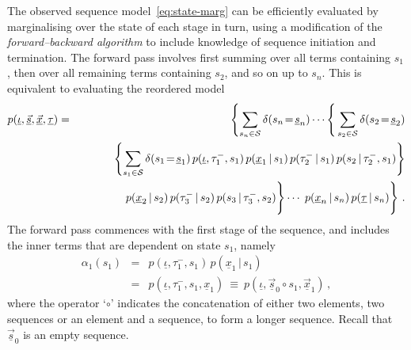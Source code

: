\documentclass[a4paper]{article}
\newcommand{\ui}{\underline{\iota}}
\newcommand{\ut}{\underline{\tau}}
\newcommand{\tm}{\tau^{-}}
\begin{document}
The observed sequence model~\eqref{eq:state-marg} can be efficiently evaluated by marginalising over the state of each stage
in turn, using a modification of the {\em forward--backward algorithm} to include knowledge of
sequence initiation and termination.
 The forward pass involves first summing over all terms containing $s_1$, then over all remaining terms containing $s_2$,
and so on up to $s_n$. This is equivalent to evaluating the reordered model
\begin{eqnarray}
   p(\ui,\underline{\vec{s}},\underline{\vec{x}},\ut) 
& = & 
   \left\{\sum_{s_n\in{\cal S}}\delta(s_n\!=\!\underline{s}_n)
\cdots
\right\{\sum_{s_2\in{\cal S}}\delta(s_2\!=\!\underline{s}_2)
\nonumber\\&&
\hspace*{10mm}{}
\left\{\sum_{s_1\in{\cal S}}\delta(s_1\!=\!\underline{s}_1)\,
p(\ui,\tm_1,s_1)\,p(\underline{x}_1\,|\,s_1)\,p(\tm_2\,|\,s_1)\,p(s_2\,|\,\tm_2,s_1)\right\}
\nonumber\\&&
\left.\rule{0pt}{6mm}
p(\underline{x}_{2}\,|\,s_2)\,p(\tm_3\,|\,s_2)\,p(s_3\,|\,\tm_3,s_2)\right\}
\cdots
\left.\rule{0pt}{6mm}\,p(\underline{x}_{n}\,|\,s_n)
\,p(\ut\,|\,s_n)\right\}
\,.
\label{eq:forward}
\end{eqnarray}
 The forward pass commences with the first stage of the sequence, and includes the inner terms that are dependent on state $s_1$, namely
\begin{eqnarray}
  \alpha_1(s_1) & = & p(\ui,\tm_1,s_1)\,p(\underline{x}_1\,|\,s_1)
\nonumber\\&=&
p(\ui,\tm_1,s_1,\underline{x}_1)~\equiv~p(\ui,\underline{\vec{s}}_0\circ s_1,\underline{\vec{x}}_1)\,,
\label{eq:alpha_1}
\end{eqnarray}
where the operator `$\circ$' indicates the concatenation of either two elements, two sequences or an element and a sequence, to form a longer sequence.
Recall that $\underline{\vec{s}}_0$ is an empty sequence.
\end{document}
